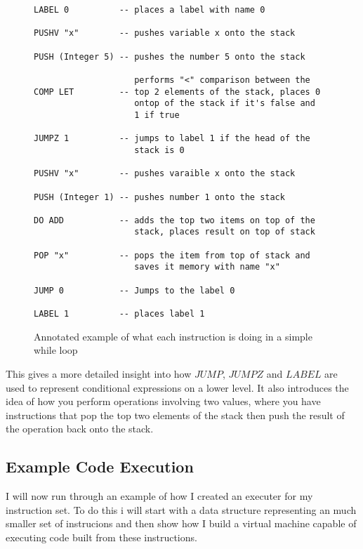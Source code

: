 \begin{figure}[h]
\centering
\begin{lstlisting}[basicstyle=\ttfamily\small]
LABEL 0	         -- places a label with name 0 

PUSHV "x"        -- pushes variable x onto the stack 

PUSH (Integer 5) -- pushes the number 5 onto the stack 

                    performs "<" comparison between the 
COMP LET         -- top 2 elements of the stack, places 0 
                    ontop of the stack if it's false and 
                    1 if true   
	                    
JUMPZ 1          -- jumps to label 1 if the head of the 
                    stack is 0 
	
PUSHV "x"        -- pushes varaible x onto the stack
	
PUSH (Integer 1) -- pushes number 1 onto the stack
	
DO ADD           -- adds the top two items on top of the
                    stack, places result on top of stack

POP "x"          -- pops the item from top of stack and
                    saves it memory with name "x"

JUMP 0           -- Jumps to the label 0         

LABEL 1          -- places label 1 			
\end{lstlisting}
\caption{Annotated example of what each instruction is doing in a simple while loop}
\label{fig:whileExp} 
\end{figure}

This gives a more detailed insight into how $JUMP$, $JUMPZ$ and $LABEL$ are used to represent conditional expressions on a lower level. It also introduces the idea of how you perform operations involving two values, where you have instructions that pop the top two elements of the stack then push the result of the operation back onto the stack.

\subsection{Example Code Execution}
\label{sec:exmpCodeExec}
I will now run through an example of how I created an executer for my instruction set. To do this i will start with a data structure representing an much smaller set of instrucions and then show how I build a virtual machine capable of executing code built from these instructions.

